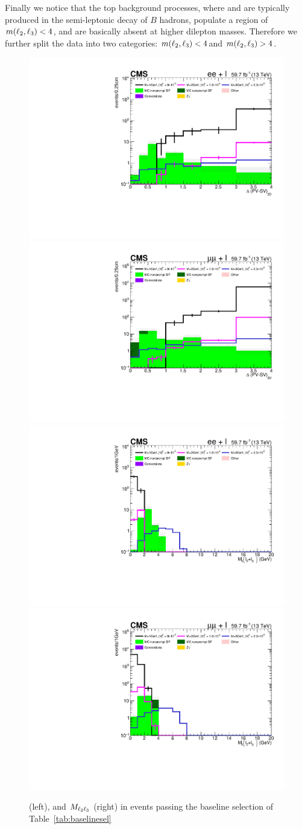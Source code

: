 Finally we notice that the top background processes, where \ltwo and
\lthree are typically produced in the semi-leptonic decay of $B$
hadrons, populate a region of $m(\ell_2,\ell_3)<4$\GeV, and are basically absent
at higher dilepton masses. Therefore we further split the data into
two categories: $m(\ell_2,\ell_3)<4$\GeV and $m(\ell_2,\ell_3)>4$\GeV.\\
 
 \begin{figure}
  \centering
  \includegraphics[clip,trim=0.9cm 0.7cm 0.7cm 0.9cm,width=.3\textwidth]{Figures/c6/selection/18/e_DeltaPV_SV_2D_zomm__final.pdf}
  \includegraphics[clip,trim=0.9cm 0.7cm 0.7cm 0.9cm,width=.3\textwidth]{Figures/c6/selection/18/mu_DeltaPV_SV_2D_zomm__final.pdf}\\
  \includegraphics[clip,trim=0.9cm 0.7cm 0.7cm 0.9cm,width=.3\textwidth]{Figures/c6/selection/18/e_M_ll_l2_l3_zoom__final.pdf}
  \includegraphics[clip,trim=0.9cm 0.7cm 0.7cm 0.9cm,width=.3\textwidth]{Figures/c6/selection/18/mu_M_ll_l2_l3_zoom__final.pdf}
  \caption{\Deltwod (left), and $M_{\ell_2 \ell_3}$ (right) in events
    passing the baseline selection of Table~\ref{tab:baselinesel}}
  \label{fig:reco_displ}
\end{figure}

